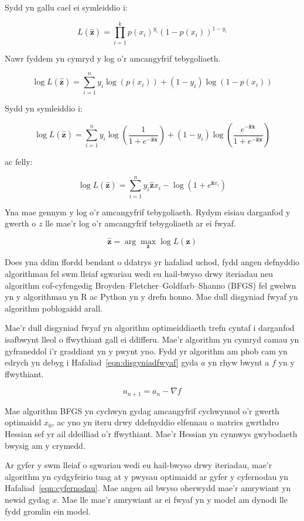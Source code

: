 Sydd yn gallu cael ei symleiddio i:

$$ L(\hat{\mathbf{z}}) = \prod_{i=1}^{k} p(x_i)^{y_i} (1 - p(x_i))^{1-y_i} $$

Nawr fyddem yn cymryd y log o'r amcangyfrif tebygoliaeth.

$$ \log L(\hat{\mathbf{z}}) = \sum_{i=1}^{n} y_{i} \log(p(x_{i})) + (1-y_{i}) \log(1-p(x_{i})) $$

Sydd yn symleiddio i:

$$ \log L(\hat{\mathbf{z}}) = \sum_{i=1}^{n} y_{i} \log \left(\frac{1}{1 + e^{-\hat{\mathbf{z}}\mathbf{x}}} \right) + (1 - y_i) \log \left(\frac{e^{-\hat{\mathbf{z}}\mathbf{x}}}{1 + e^{-\hat{\mathbf{z}}\mathbf{x}}} \right) $$

ac felly:

$$ \log L(\hat{\mathbf{z}}) = \sum_{i=1}^{n} y_i \hat{\mathbf{z}} x_i - \log(1 + e^{\hat{\mathbf{z}} x_i}) $$

Yna mae gennym y log o'r amcangyfrif tebygoliaeth. Rydym eisiau darganfod y gwerth o $z$ lle mae'r log o'r amcangyfrif tebygoliaeth ar ei fwyaf.

$$ \hat{\mathbf{z}} = \arg \max_{\mathbf{z}} \log L(\mathbf{z})  $$

Does yna ddim ffordd bendant o ddatrys yr hafaliad uchod, fydd angen defnyddio algorithmau fel swm lleiaf sgwariau wedi eu hail-bwyso drwy iteriadau \cite{IWLS} neu algorithm cof-cyfengedig Broyden–Fletcher–Goldfarb–Shanno (BFGS) \cite{LBFGS} fel gwelwn yn y algorithmau yn R ac Python yn y drefn honno. Mae dull disgyniad fwyaf yn algorithm poblogaidd arall.

Mae'r dull disgyniad fwyaf yn algorithm optimeiddiaeth trefn cyntaf i darganfod isafbwynt lleol o ffwythiant gall ei ddifferu. Mae'r algorithm yn cymryd camau yn gyfraneddol i'r graddiant yn y pwynt yno. Fydd yr algorithm am phob cam yn edrych yn debyg i Hafaliad~\ref{eqn:disgyniadfwyaf} gyda $a$ yn rhyw bwynt a $f$ yn y ffwythiant.

\begin{equation}\label{eqn:disgyniadfwyaf}
  a_{n+1} = a_{n} - \nabla f
\end{equation}

Mae algorithm BFGS yn cychwyn gydag amcangyfrif cychwynnol o'r gwerth optimaidd $x_0$, ac yno yn iteru drwy ddefnyddio elfennau o matrics gwrthdro Hessian sef yr ail ddeilliad o'r ffwythiant. Mae'r Hessian yn cynnwys gwybodaeth bwysig am y crymedd.

Ar gyfer y swm lleiaf o sgwariau wedi eu hail-bwyso drwy iteriadau, mae'r algorithm yn cydgyfeirio tuag at y pwysau optimaidd ar gyfer y cyfernodau yn Hafaliad~\ref{eqn:cyfernodau}. Mae angen ail bwyso oherwydd mae'r amrywiant yn newid gydag $x$. Mae lle mae'r amrywiant ar ei fwyaf yn y model am dynodi lle fydd gromlin ein model.

